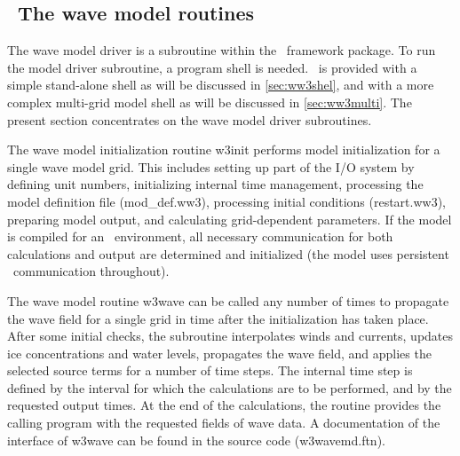 \vssub
\subsection{~The wave model routines} \label{sec:core}
\vssub

The wave model driver is a subroutine within the \ws\ framework package. 
To run the model driver subroutine, a program shell is needed. 
\ws\ is provided with a simple stand-alone shell as
will be discussed in \para\ref{sec:ww3shel}, and with a more complex
multi-grid model shell as will be discussed in \para\ref{sec:ww3multi}. The
present section concentrates on the wave model driver subroutines.

The wave model initialization routine {\F w3init} performs model
initialization for a single wave model grid. This includes setting up part of
the I/O system by defining unit numbers, initializing internal time
management, processing the model definition file ({\file mod\_def.ww3}),
processing initial conditions ({\file restart.ww3}), preparing model output,
and calculating grid-dependent parameters. If the model is compiled for an
\mpi\ environment, all necessary communication for both calculations and
output are determined and initialized (the model uses persistent \mpi\
communication throughout).

The wave model routine {\F w3wave} can be called any number of times to
propagate the wave field for a single grid in time after the initialization
has taken place. After some initial checks, the subroutine interpolates winds
and currents, updates ice concentrations and water levels, propagates the wave
field, and applies the selected source terms for a number of time steps. The
internal time step is defined by the interval for which the calculations are
to be performed, and by the requested output times. At the end of the
calculations, the routine provides the calling program with the requested
fields of wave data. A documentation of the interface of {\F w3wave} can be
found in the source code ({\file w3wavemd.ftn}).

 

